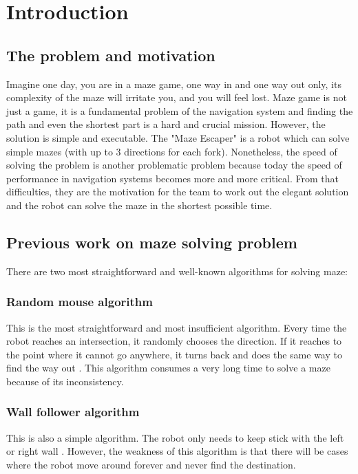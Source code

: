 \documentclass{article}
\begin{document}
\section{Introduction}

\subsection{The problem and motivation}
Imagine one day, you are in a maze game, one way in and one way out only, its complexity of the maze will irritate you, and you will feel lost. Maze game is not just a game, it is a fundamental problem of the navigation system and finding the path and even the shortest part is a hard and crucial mission. However, the solution is simple and executable. The "Maze Escaper" is a robot which can solve simple mazes (with up to 3 directions for each fork). Nonetheless, the speed of solving the problem is another problematic problem because today the speed of performance in navigation systems becomes more and more critical. From that difficulties, they are the motivation for the team to work out the elegant solution and the robot can solve the maze in the shortest possible time.\\

\subsection{Previous work on maze solving problem}
There are two most straightforward and well-known algorithms for solving maze:
\subsubsection{Random mouse algorithm}
This is the most straightforward and most insufficient algorithm. Every time the robot reaches an intersection, it randomly chooses the direction. If it reaches to the point where it cannot go anywhere, it turns back and does the same way to find the way out \cite{ref1}. This algorithm consumes a very long time to solve a maze because of its inconsistency.\\

\subsubsection{Wall follower algorithm}
This is also a simple algorithm. The robot only needs to keep stick with the left or right wall \cite{ref1}. However, the weakness of this algorithm is that there will be cases where the robot move around forever and never find the destination.\\
\end{document}
